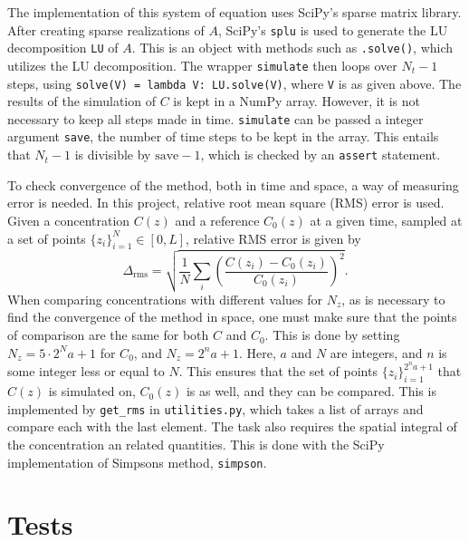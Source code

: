 \documentclass{article}
\begin{document}
    The implementation of this system of equation uses SciPy's sparse matrix library. After creating sparse realizations of $A$, SciPy's \verb|splu| is used to generate the LU decomposition \verb|LU| of $A$. This is an object with methods such as \verb|.solve()|, which utilizes the LU decomposition. The wrapper \verb|simulate| then loops over $N_t-1$ steps, using \verb|solve(V) = lambda V: LU.solve(V)|, where \verb|V| is as given above. The results of the simulation of $C$ is kept in a NumPy array. However, it is not necessary to keep all steps made in time. \verb|simulate| can be passed a integer argument \verb|save|, the number of time steps to be kept in the array. This entails that $N_t-1$ is divisible by $\mathrm{save}-1$, which is checked by an \verb|assert| statement.
    
    To check convergence of the method, both in time and space, a way of measuring error is needed. In this project, relative root mean square (RMS) error is used. Given a concentration $C(z)$ and a reference $C_0(z)$ at a given time, sampled at a set of points $\{z_i\}_{i=1}^N \in [0, L]$, relative RMS error is given by
    \begin{equation*}
        \Delta_\mathrm{rms} = \sqrt{\frac{1}{N}\sum_i \left(\frac{C(z_i) - C_0(z_i)}{C_0(z_i)}\right)^2}.
    \end{equation*}
    When comparing concentrations with different values for $N_z$, as is necessary to find the convergence of the method in space, one must make sure that the points of comparison are the same for both $C$ and $C_0$. This is done by setting $N_z = 5\cdot 2^Na + 1$ for $C_0$, and $N_z = 2^n a + 1$. Here, $a$ and $N$ are integers, and $n$ is some integer less or equal to $N$. This ensures that the set of points $\{z_i\}_{i=1}^{2^na+1}$ that $C(z)$ is simulated on, $C_0(z)$ is as well, and they can be compared. This is implemented by \verb|get_rms| in \verb|utilities.py|, which takes a list of arrays and compare each with the last element. The task also requires the spatial integral of the concentration an related quantities. This is done with the SciPy implementation of Simpsons method, \verb|simpson|. 

    \section*{Tests}
\end{document}
